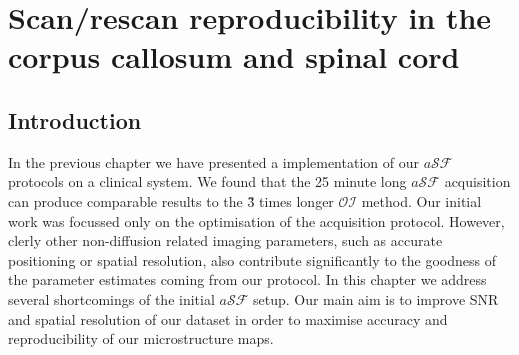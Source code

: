 \newcommand{\SF}{{\ensuremath{\mathcal{SF}}}}
\newcommand{\OI}{{\ensuremath{\mathcal{OI}}}}
\newcommand{\SD}{{\ensuremath{\mathcal{SF}_{pulses}}}}
\newcommand{\DO}{{\ensuremath{\mathcal{SF}_{dirs}}}}
\newcommand{\FD}{{\SF}}
\newcommand{\FDmod}{{\ensuremath{\FD_{mod}}}}
\newcommand{\SFasym}{{\ensuremath{a\mathcal{SF}}}}

\newcommand{\SFshort}{\SF$_{90}$}
\newcommand{\SFlong}{\SF$_{360}$}
\newcommand{\OIlong}{\OI$_{360}$}


\newsavebox{\poorBox}
\savebox{\poorBox}{\textcolor{red}{\rule{0.05in}{0.05in}}}
\newsavebox{\fairBox}
\savebox{\fairBox}{\textcolor{orange}{\rule{0.05in}{0.05in}}}
\newsavebox{\moderateBox}
\savebox{\moderateBox}{\textcolor{yellow}{\rule{0.05in}{0.05in}}}
\newsavebox{\substantialBox}
\savebox{\substantialBox}{\textcolor{lime}{\rule{0.05in}{0.05in}}}
\newsavebox{\perfectBox}
\savebox{\perfectBox}{\textcolor{green}{\rule{0.05in}{0.05in}}}


\chapter[Scan/rescan in the corpus callosum]{Scan/rescan reproducibility in the corpus callosum and spinal cord}
\section{Introduction}
In the previous chapter we have presented a implementation of our {\SFasym} protocols on a clinical system. We found that the 25 minute long \SFasym{} acquisition can produce comparable results to the \~3 times longer \OI{} method. Our initial work was focussed only on the optimisation of the acquisition protocol. However, clerly other non-diffusion related imaging parameters, such as accurate positioning or spatial resolution, also contribute significantly to the goodness of the parameter estimates coming from our protocol. In this chapter we address several shortcomings of the initial \SFasym{} setup. Our main aim is to improve SNR and spatial resolution of our dataset in order to maximise accuracy and  reproducibility of our microstructure maps. 


